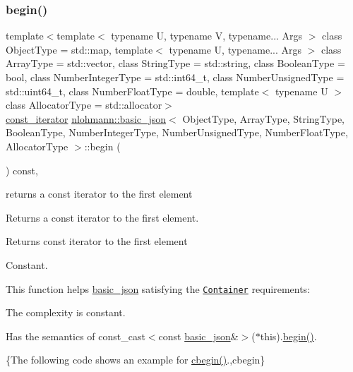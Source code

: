 \subsubsection{\texorpdfstring{begin()}{begin()}\hspace{0.1cm}{\footnotesize\ttfamily [2/2]}}
{\footnotesize\ttfamily template$<$template$<$ typename U, typename V, typename... Args $>$ class Object\+Type = std\+::map, template$<$ typename U, typename... Args $>$ class Array\+Type = std\+::vector, class String\+Type  = std\+::string, class Boolean\+Type  = bool, class Number\+Integer\+Type  = std\+::int64\+\_\+t, class Number\+Unsigned\+Type  = std\+::uint64\+\_\+t, class Number\+Float\+Type  = double, template$<$ typename U $>$ class Allocator\+Type = std\+::allocator$>$ \\
\hyperlink{classnlohmann_1_1basic__json_1_1const__iterator}{const\+\_\+iterator} \hyperlink{classnlohmann_1_1basic__json}{nlohmann\+::basic\+\_\+json}$<$ Object\+Type, Array\+Type, String\+Type, Boolean\+Type, Number\+Integer\+Type, Number\+Unsigned\+Type, Number\+Float\+Type, Allocator\+Type $>$\+::begin (\begin{DoxyParamCaption}{ }\end{DoxyParamCaption}) const\hspace{0.3cm}{\ttfamily [inline]}, {\ttfamily [noexcept]}}



returns a const iterator to the first element 

Returns a const iterator to the first element.

 \begin{DoxyReturn}{Returns}
const iterator to the first element
\end{DoxyReturn}
Constant.

This function helps {\ttfamily \hyperlink{classnlohmann_1_1basic__json}{basic\+\_\+json}} satisfying the \href{http://en.cppreference.com/w/cpp/concept/Container}{\tt Container} requirements\+:
\begin{DoxyItemize}
\item The complexity is constant.
\item Has the semantics of {\ttfamily const\+\_\+cast$<$const \hyperlink{classnlohmann_1_1basic__json}{basic\+\_\+json}\&$>$($\ast$this).\hyperlink{classnlohmann_1_1basic__json_ad4e381c54039607be08d7af41a1f6ad1}{begin()}}.
\end{DoxyItemize}

\{The following code shows an example for {\ttfamily \hyperlink{classnlohmann_1_1basic__json_a7355a41b0033ff8a27d58550544d5a59}{cbegin()}}.,cbegin\}


